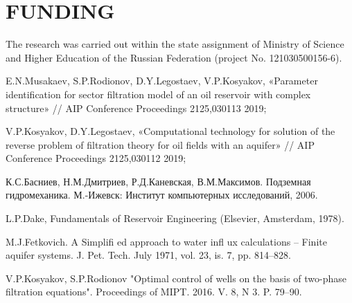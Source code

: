 \documentclass{article}
\begin{document}
\section{FUNDING}
The research was carried out within the state assignment of Ministry of Science and Higher Education of the Russian Federation (project No. 121030500156-6).

%
%
\begin{thebibliography}{99}
 E.N.Musakaev, S.P.Rodionov, D.Y.Legostaev, V.P.Kosyakov,  «Parameter identification for sector filtration model of an oil reservoir with complex structure» // AIP Conference Proceedings 2125,030113 2019;

 V.P.Kosyakov, D.Y.Legostaev,  «Computational technology for solution of the reverse problem of filtration theory for oil fields with an aquifer» // AIP Conference Proceedings 2125,030112 2019;

 К.С.Басниев, Н.М.Дмитриев, Р.Д.Каневская, В.М.Максимов. Подземная гидромеханика.  М.-Ижевск: Институт компьютерных исследований, 2006. 

 L.P.Dake, Fundamentals of Reservoir Engineering (Elsevier, Amsterdam, 1978).

 M.J.Fetkovich. A Simplifi ed approach to water infl ux calculations – Finite aquifer systems. J. Pet. Tech. July 1971, vol. 23, is. 7, pp. 814–828.

 V.P.Kosyakov, S.P.Rodionov "Optimal control of wells on the basis of two-phase filtration equations". Proceedings of MIPT. 2016. V. 8, N 3. P. 79–90.


\end{thebibliography}
\end{document}
